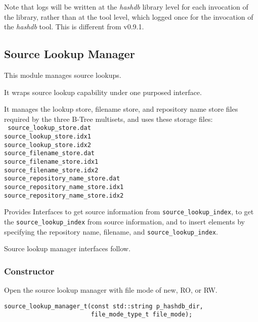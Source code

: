 \documentclass[12pt,twoside]{article}
\newcommand{\hdb}{\emph{hashdb}\xspace}
\begin{document}
Note that logs will be written at the \hdb library level
for each invocation of the library,
rather than at the tool level, which logged once
for the invocation of the \hdb tool.
This is different from v0.9.1.

\subsection{Source Lookup Manager}
This module manages source lookups.
\begin{compactitem}
\item It wraps source lookup capability under one purposed interface.
\item It manages the lookup store, filename store,
and repository name store files required by the three B-Tree multisets,
and uses these storage files: \\
\texttt{
source\_lookup\_store.dat \\
source\_lookup\_store.idx1 \\
source\_lookup\_store.idx2 \\
source\_filename\_store.dat \\
source\_filename\_store.idx1 \\
source\_filename\_store.idx2 \\
source\_repository\_name\_store.dat \\
source\_repository\_name\_store.idx1 \\
source\_repository\_name\_store.idx2
}
\item Provides Interfaces to get source information
from \texttt{source\_lookup\_index},
to get the \texttt{source\_lookup\_index} from source information,
and to insert elements by specifying the repository name, filename,
and \texttt{source\_lookup\_index}.
\end{compactitem}

Source lookup manager interfaces follow.
\subsubsection{Constructor}
Open the source lookup manager with file mode of new, RO, or RW.
\begin{small}
\begin{verbatim}
source_lookup_manager_t(const std::string p_hashdb_dir,
                        file_mode_type_t file_mode);
\end{verbatim}
\end{small}
\end{document}
